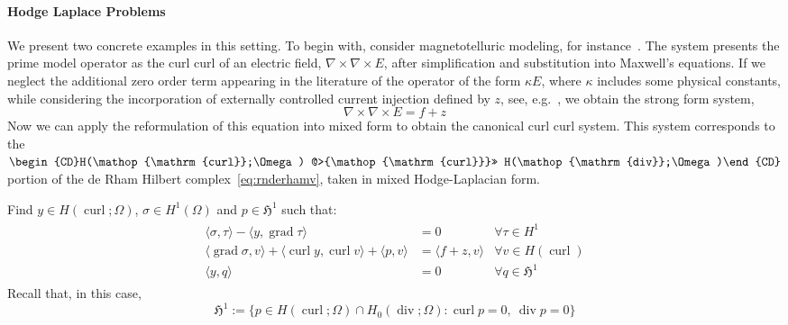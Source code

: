 \documentclass{article}
\DeclareMathOperator{\grad}{grad}
\DeclareMathOperator{\curl}{curl}
\DeclareMathOperator{\divergence}{div}
\newcommand{\f}[1]{\mathfrak{#1}}
\begin{document}
\paragraph{Hodge Laplace Problems}

We present two concrete examples in this setting.
To begin with, consider magnetotelluric modeling, for instance~\cite{CASTILLOREYES2022105030}. The system presents the prime model operator as the curl curl of an electric field, $\nabla\times\nabla\times E$, after simplification and substitution into Maxwell's equations. If we neglect the additional zero order term appearing in the literature of the operator of the form $\kappa E$, where $\kappa$ includes some physical constants, while considering the incorporation of externally controlled current injection defined by $z$, see, e.g.~\cite{li2020improved}, we obtain the strong form system,
\[
	\nabla\times\nabla\times E = f+z
\]
Now we can apply the reformulation of this equation into mixed form to obtain the canonical curl curl system. This system corresponds to the $\begin{CD}H(\curl;\Omega)
		@>{\curl}>>
		H(\divergence;\Omega)\end{CD}$ portion of the de Rham Hilbert complex~\eqref{eq:rnderhamv}, taken in mixed Hodge-Laplacian form.  


Find $y\in H(\curl;\Omega)$, $\sigma\in H^1(\Omega)$ and $p\in\mathfrak H^1$ such that:
\begin{align}\label{eq:curlcurl}
	\begin{array}{rll}
		\langle \sigma, \tau \rangle - \langle y, \grad \tau \rangle
		 & = 0
		 & \forall \tau \in H^{1}
		\\
		\langle \grad\sigma,v \rangle + \langle \curl y, \curl v \rangle + \langle p,v \rangle
		 & = \langle f+z,v \rangle
		 & \forall v \in H(\curl)
		\\
		\langle y, q \rangle
		 & = 0
		 & \forall q \in \mathfrak H^1
	\end{array}
\end{align}
Recall that, in this case,
\[\f H^1:=\{p\in H(\curl;\Omega)\cap H_0(\divergence;\Omega):
		\curl p=0,\ \divergence p=0\}
        \]
\end{document}

